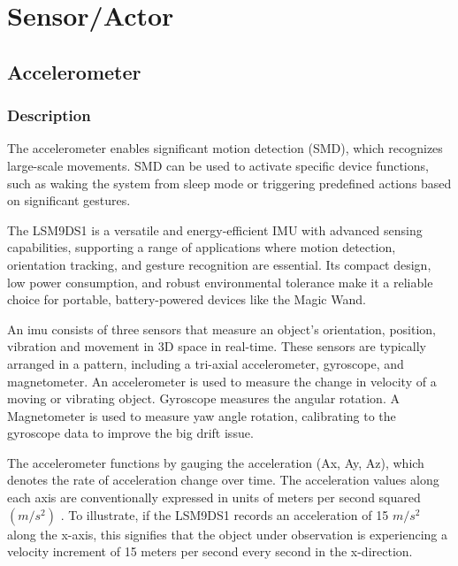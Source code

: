 %
%

\chapter{Sensor/Actor}

\section{Accelerometer}

\subsection{Description}
The accelerometer enables significant motion detection (SMD), which recognizes large-scale movements. SMD can be used to activate specific device functions, such as waking the system from sleep mode or triggering predefined actions based on significant gestures.\cite{Zhou:2020}

The LSM9DS1 is a versatile and energy-efficient IMU with advanced sensing capabilities, supporting a range of applications where motion detection, orientation tracking, and gesture recognition are essential. Its compact design, low power consumption, and robust environmental tolerance make it a reliable choice for portable, battery-powered devices like the Magic Wand.\cite{Zhou:2020}
	
An \ac{imu} consists of three sensors that measure an object's orientation, position, vibration and movement in 3D space in real-time. These sensors are typically arranged in a pattern, including a tri-axial accelerometer, gyroscope, and magnetometer\cite{Ahmad:2013}. An accelerometer is used to measure the change in velocity of a moving or vibrating object\cite{Ahmad:2013}. Gyroscope measures the angular rotation\cite{Ahmad:2013}. A Magnetometer is used to measure yaw angle rotation, calibrating to the gyroscope data to improve the big drift issue\cite{Ahmad:2013}. 

The accelerometer functions by gauging the acceleration (Ax, Ay, Az), which denotes the rate of acceleration change over time. The acceleration values along each axis are conventionally expressed in units of meters per second squared $(m/s^2)$ \cite{Vernier:2023}. To illustrate, if the LSM9DS1 records an acceleration of 15 $m/s^2$ along the x-axis, this signifies that the object under observation is experiencing a velocity increment of 15 meters per second every second in the x-direction.

